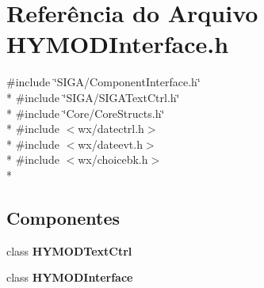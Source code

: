 \section{Referência do Arquivo H\+Y\+M\+O\+D\+Interface.\+h}
\label{_h_y_m_o_d_interface_8h}
{\ttfamily \#include \char`\"{}S\+I\+G\+A/\+Component\+Interface.\+h\char`\"{}}\\*
{\ttfamily \#include \char`\"{}S\+I\+G\+A/\+S\+I\+G\+A\+Text\+Ctrl.\+h\char`\"{}}\\*
{\ttfamily \#include \char`\"{}Core/\+Core\+Structs.\+h\char`\"{}}\\*
{\ttfamily \#include $<$wx/datectrl.\+h$>$}\\*
{\ttfamily \#include $<$wx/dateevt.\+h$>$}\\*
{\ttfamily \#include $<$wx/choicebk.\+h$>$}\\*
\subsection*{Componentes}
\begin{DoxyCompactItemize}
\item 
class {\bf H\+Y\+M\+O\+D\+Text\+Ctrl}
\item 
class {\bf H\+Y\+M\+O\+D\+Interface}
\end{DoxyCompactItemize}
